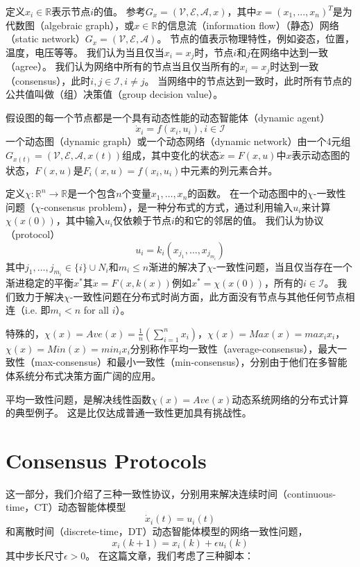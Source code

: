 \documentclass{article}
\begin{document}
定义$x_i\in \mathbb{R}$表示节点$i$的值。
参考$G_x=(\mathcal{V},\mathcal{E},\mathcal{A},x)$，其中$x=(x_1,...,x_n)^T$是为代数图（algebraic graph），或$x\in \mathbb{R}$的信息流（information flow）（静态）网络（static network）$G_x=(\mathcal{V},\mathcal{E},\mathcal{A})$。
节点的值表示物理特性，例如姿态，位置，温度，电压等等。
我们认为当且仅当$x_i=x_j$时，节点$i$和$j$在网络中达到一致（agree）。
我们认为网络中所有的节点当且仅当所有的$x_i=x_j$时达到一致（consensus），此时$i,j\in \mathcal{I}, i\ne j$。
当网络中的节点达到一致时，此时所有节点的公共值叫做（组）决策值（group decision value）。

假设图的每一个节点都是一个具有动态性能的动态智能体（dynamic agent）
\begin{equation}
    \dot{x}_i = f(x_i, u_i), i\in \mathcal{I}
\end{equation}
一个动态图（dynamic graph）或一个动态网络（dynamic network）由一个4元组$G_{x(t)} = (\mathcal{V},\mathcal{E},\mathcal{A},x(t))$组成，其中变化的状态$\dot{x}=F(x,u)$中$x$表示动态图的状态，$F(x,u)$是$F_i(x,u)=f(x_i,u_i)$中元素的列元素合并。

定义$\chi: \mathbb{R}^n \rightarrow \mathbb{R}$是一个包含$n$个变量$x_1,\dots,x_n$的函数。
在一个动态图中的$\chi$-一致性问题（$\chi$-consensus problem），是一种分布式的方式，通过利用输入$u_i$来计算$\chi(x(0))$，其中输入$u_i$仅依赖于节点$i$的和它的邻居的值。
我们认为协议（protocol）
\begin{equation}
    u_i = k_i(x_{j_1},\dots,x_{j_{m_i}})
\end{equation}
其中$j_1,\dots,j_{m_i}\in \{i\} \cup N_i$和$m_i\leq n$渐进的解决了$\chi$-一致性问题，当且仅当存在一个渐进稳定的平衡$x^*$其$\dot{x}=F(x,k(x))$例如$x^*=\chi(x(0))$，所有的$i\in \mathcal{I}$。
我们致力于解决$\chi$-一致性问题在分布式时尚方面，此方面没有节点与其他任何节点相连（i.e. 即$m_i < n$ for all $i$）。

特殊的，$\chi(x)=Ave(x)=\frac{1}{n}(\sum_{i=1}^{n}x_i)$，$\chi(x)=Max(x)=max_ix_i$，$\chi(x)=Min(x)=min_ix_i$分别称作平均一致性（average-consensus），最大一致性（max-consensus）和最小一致性（min-consensus），分别由于他们在多智能体系统分布式决策方面广阔的应用。

平均一致性问题，是解决线性函数$\chi(x)=Ave(x)$动态系统网络的分布式计算的典型例子。
这是比仅达成普通一致性更加具有挑战性。


\section{Consensus Protocols}
这一部分，我们介绍了三种一致性协议，分别用来解决连续时间（continuous-time，CT）动态智能体模型
\begin{equation}
    \dot{x}_i(t) = u_i(t)
\end{equation}
和离散时间（discrete-time，DT）动态智能体模型的网络一致性问题，
\begin{equation}
    x_i(k+1) = x_i(k)+\epsilon u_i(k)
\end{equation}
其中步长尺寸$\epsilon>0$。
在这篇文章，我们考虑了三种脚本：
\end{document}
